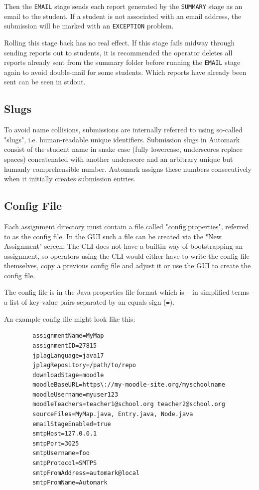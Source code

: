 \documentclass[12pt,a4paper,oneside]{report}
\begin{document}
	\pagebreak
	Then the \lstinline|EMAIL| stage sends each report generated by the \lstinline|SUMMARY| stage as an email to the student. If a student is not associated with an email address, the submission will be marked with an \lstinline|EXCEPTION| problem.

	Rolling this stage back has no real effect. If this stage fails midway through sending reports out to students, it is recommended the operator deletes all reports already sent from the summary folder before running the \lstinline|EMAIL| stage again to avoid double-mail for some students. Which reports have already been sent can be seen in stdout.

	\subsection{Slugs} \label{subsec:slugs}
	To avoid name collisions, submissions are internally referred to using so-called "slugs", i.e. human-readable unique identifiers. Submission slugs in Automark consist of the student name in snake case (fully lowercase, underscores replace spaces) concatenated with another underscore and an arbitrary unique but humanly comprehensible number. Automark assigns these numbers consecutively when it initially creates submission entries.

	\subsection{Config File}
	Each assignment directory must contain a file called "config.properties", referred to as the config file. In the GUI such a file can be created via the "New Assignment" screen. The CLI does not have a builtin way of bootstrapping an assignment, so operators using the CLI would either have to write the config file themselves, copy a previous config file and adjust it or use the GUI to create the config file.

	The config file is in the Java properties file format which is -- in simplified terms -- a list of key-value pairs separated by an equals sign (\lstinline|=|).

	An example config file might look like this:
	\begin{lstlisting}
		assignmentName=MyMap
		assignmentID=27815
		jplagLanguage=java17
		jplagRepository=/path/to/repo
		downloadStage=moodle
		moodleBaseURL=https\://my-moodle-site.org/myschoolname
		moodleUsername=myuser123
		moodleTeachers=teacher1@school.org teacher2@school.org
		sourceFiles=MyMap.java, Entry.java, Node.java
		emailStageEnabled=true
		smtpHost=127.0.0.1
		smtpPort=3025
		smtpUsername=foo
		smtpProtocol=SMTPS
		smtpFromAddress=automark@local
		smtpFromName=Automark
	\end{lstlisting}
\end{document}
